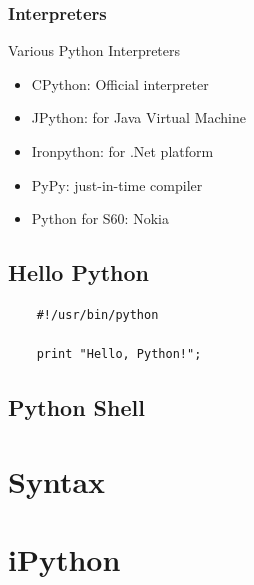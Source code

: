 \documentclass[UTF8]{beamer}
\begin{document}
\begin{frame}
  \frametitle{Interpreters}
  \begin{block}{Various Python Interpreters}
    \begin{itemize}
      \item CPython: Official interpreter
      \item JPython: for Java Virtual Machine
      \item Ironpython: for .Net platform
      \item PyPy: just-in-time compiler
      \item Python for S60: Nokia
    \end{itemize}
  \end{block}
\end{frame}

\subsection{Hello Python}
\begin{frame}[fragile]
  \begin{verbatim}
    #!/usr/bin/python

    print "Hello, Python!";
  \end{verbatim}
\end{frame}

\subsection{Python Shell}

\section{Syntax}

\section{iPython}
\end{document}
